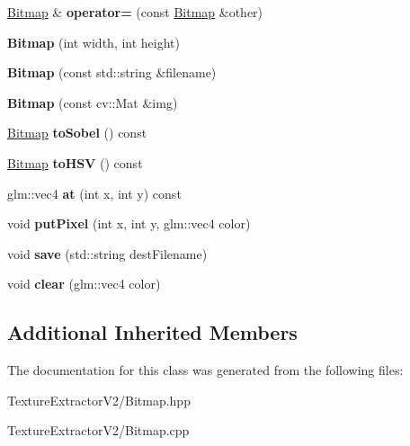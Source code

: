 \begin{DoxyCompactItemize}
\item 
\hypertarget{class_bitmap_a7a1a9969ca533d4adebe7c44a26ee092}{}\hyperlink{class_bitmap}{Bitmap} \& {\bfseries operator=} (const \hyperlink{class_bitmap}{Bitmap} \&other)\label{class_bitmap_a7a1a9969ca533d4adebe7c44a26ee092}

\item 
\hypertarget{class_bitmap_a40526748415c8bbc58a8510d636c20f4}{}{\bfseries Bitmap} (int width, int height)\label{class_bitmap_a40526748415c8bbc58a8510d636c20f4}

\item 
\hypertarget{class_bitmap_a5a26ccbab9af0b40421eacc21e75536d}{}{\bfseries Bitmap} (const std\+::string \&filename)\label{class_bitmap_a5a26ccbab9af0b40421eacc21e75536d}

\item 
\hypertarget{class_bitmap_a5614426bc7923697c1d1f35e04a37c3c}{}{\bfseries Bitmap} (const cv\+::\+Mat \&img)\label{class_bitmap_a5614426bc7923697c1d1f35e04a37c3c}

\item 
\hypertarget{class_bitmap_a99d5b69de318e80c9af1f660f46c00c4}{}\hyperlink{class_bitmap}{Bitmap} {\bfseries to\+Sobel} () const \label{class_bitmap_a99d5b69de318e80c9af1f660f46c00c4}

\item 
\hypertarget{class_bitmap_a80c5adbea91bb7311008dab576dc82c6}{}\hyperlink{class_bitmap}{Bitmap} {\bfseries to\+H\+S\+V} () const \label{class_bitmap_a80c5adbea91bb7311008dab576dc82c6}

\item 
\hypertarget{class_bitmap_af5c0948748aa68b2737871d20201c2e5}{}glm\+::vec4 {\bfseries at} (int x, int y) const \label{class_bitmap_af5c0948748aa68b2737871d20201c2e5}

\item 
\hypertarget{class_bitmap_a6f880db00f7d05e6284005a6553aa17c}{}void {\bfseries put\+Pixel} (int x, int y, glm\+::vec4 color)\label{class_bitmap_a6f880db00f7d05e6284005a6553aa17c}

\item 
\hypertarget{class_bitmap_a9ca33640e5554ee36b435fa789260903}{}void {\bfseries save} (std\+::string dest\+Filename)\label{class_bitmap_a9ca33640e5554ee36b435fa789260903}

\item 
\hypertarget{class_bitmap_a409022ea446f41edcce42c076dff1608}{}void {\bfseries clear} (glm\+::vec4 color)\label{class_bitmap_a409022ea446f41edcce42c076dff1608}

\end{DoxyCompactItemize}
\subsection*{Additional Inherited Members}


The documentation for this class was generated from the following files\+:\begin{DoxyCompactItemize}
\item 
Texture\+Extractor\+V2/Bitmap.\+hpp\item 
Texture\+Extractor\+V2/Bitmap.\+cpp\end{DoxyCompactItemize}

